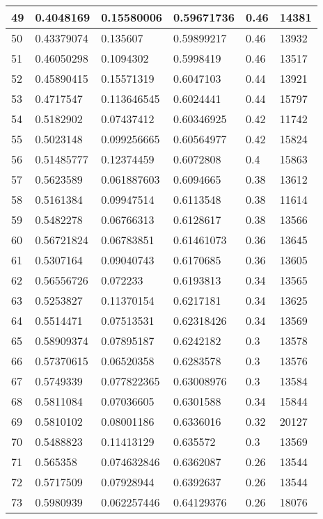 \begin{longtable}{|l|l|l|l|l|l|}
49 & 0.4048169 & 0.15580006 & 0.59671736 & 0.46 & 14381 \\ \hline 
50 & 0.43379074 & 0.135607 & 0.59899217 & 0.46 & 13932 \\ \hline 
51 & 0.46050298 & 0.1094302 & 0.5998419 & 0.46 & 13517 \\ \hline 
52 & 0.45890415 & 0.15571319 & 0.6047103 & 0.44 & 13921 \\ \hline 
53 & 0.4717547 & 0.113646545 & 0.6024441 & 0.44 & 15797 \\ \hline 
54 & 0.5182902 & 0.07437412 & 0.60346925 & 0.42 & 11742 \\ \hline 
55 & 0.5023148 & 0.099256665 & 0.60564977 & 0.42 & 15824 \\ \hline 
56 & 0.51485777 & 0.12374459 & 0.6072808 & 0.4 & 15863 \\ \hline 
57 & 0.5623589 & 0.061887603 & 0.6094665 & 0.38 & 13612 \\ \hline 
58 & 0.5161384 & 0.09947514 & 0.6113548 & 0.38 & 11614 \\ \hline 
59 & 0.5482278 & 0.06766313 & 0.6128617 & 0.38 & 13566 \\ \hline 
60 & 0.56721824 & 0.06783851 & 0.61461073 & 0.36 & 13645 \\ \hline 
61 & 0.5307164 & 0.09040743 & 0.6170685 & 0.36 & 13605 \\ \hline 
62 & 0.56556726 & 0.072233 & 0.6193813 & 0.34 & 13565 \\ \hline 
63 & 0.5253827 & 0.11370154 & 0.6217181 & 0.34 & 13625 \\ \hline 
64 & 0.5514471 & 0.07513531 & 0.62318426 & 0.34 & 13569 \\ \hline 
65 & 0.58909374 & 0.07895187 & 0.6242182 & 0.3 & 13578 \\ \hline 
66 & 0.57370615 & 0.06520358 & 0.6283578 & 0.3 & 13576 \\ \hline 
67 & 0.5749339 & 0.077822365 & 0.63008976 & 0.3 & 13584 \\ \hline 
68 & 0.5811084 & 0.07036605 & 0.6301588 & 0.34 & 15844 \\ \hline 
69 & 0.5810102 & 0.08001186 & 0.6336016 & 0.32 & 20127 \\ \hline 
70 & 0.5488823 & 0.11413129 & 0.635572 & 0.3 & 13569 \\ \hline 
71 & 0.565358 & 0.074632846 & 0.6362087 & 0.26 & 13544 \\ \hline 
72 & 0.5717509 & 0.07928944 & 0.6392637 & 0.26 & 13544 \\ \hline 
73 & 0.5980939 & 0.062257446 & 0.64129376 & 0.26 & 18076 \\ \hline 

\end{longtable}
